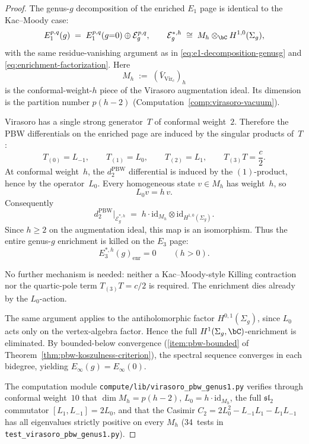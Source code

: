 \begin{proof}
The genus-$g$ decomposition of the enriched $E_1$ page is identical to
the Kac--Moody case:
\[
E_1^{p,q}(g) \;=\; E_1^{p,q}(g{=}0) \oplus \mathcal{E}^{p,q}_g,
\qquad
\mathcal{E}_g^{*,h} \;\cong\; M_h \otimes_{\bC} H^{1,0}(\Sigma_g),
\]
with the same residue-vanishing argument as in
\eqref{eq:e1-decomposition-genusg} and
\eqref{eq:enrichment-factorization}.  Here
\[
M_h \;:=\; (\bar{V}_{\mathrm{Vir}_c})_h
\]
is the conformal-weight-$h$ piece of the Virasoro augmentation ideal.
Its dimension is the partition number $p(h-2)$
\textup{(}Computation~\textup{\ref{comp:virasoro-vacuum}}\textup{)}.

Virasoro has a single
strong generator~$T$ of conformal weight~$2$.  Therefore the PBW
differentials on the enriched page are induced by the singular
products of~$T$:
\[
T_{(0)} = L_{-1}, \qquad
T_{(1)} = L_0, \qquad
T_{(2)} = L_1, \qquad
T_{(3)}T = \frac{c}{2}.
\]
At conformal weight~$h$, the $d_2^{\mathrm{PBW}}$ differential is
induced by the $(1)$-product, hence by the operator~$L_0$.
Every homogeneous state $v \in M_h$ has weight~$h$, so
\[
L_0 v = h\,v.
\]
Consequently
\[
d_2^{\mathrm{PBW}}\big|_{\mathcal{E}_g^{*,h}}
\;=\;
h \cdot \mathrm{id}_{M_h}
\otimes
\mathrm{id}_{H^{1,0}(\Sigma_g)}.
\]
Since $h \geq 2$ on the augmentation ideal, this map is an
isomorphism.  Thus the entire genus-$g$ enrichment is killed on the
$E_3$ page:
\[
E_3^{*,h}(g)_{\mathrm{enr}} = 0
\qquad (h > 0).
\]

No further mechanism is needed: neither a Kac--Moody-style Killing
contraction nor the quartic-pole term $T_{(3)}T = c/2$ is required.
The enrichment dies already by the $L_0$-action.

The same argument applies to the antiholomorphic factor
$H^{0,1}(\Sigma_g)$, since $L_0$ acts only on the vertex-algebra
factor.  Hence the full $H^1(\Sigma_g,\bC)$-enrichment is eliminated.
By bounded-below convergence
\textup{(}\ref{item:pbw-bounded} of
Theorem~\ref{thm:pbw-koszulness-criterion}\textup{)}, the spectral
sequence converges in each bidegree, yielding
$E_\infty(g) = E_\infty(0)$.

The computation module
\texttt{compute/lib/virasoro\_pbw\_genus1.py}
verifies through conformal weight~$10$ that
$\dim M_h = p(h-2)$,
$L_0 = h \cdot \mathrm{id}_{M_h}$,
the full $\mathfrak{sl}_2$ commutator $[L_1, L_{-1}] = 2L_0$,
and that the Casimir $C_2 = 2L_0^2 - L_{-1}L_1 - L_1L_{-1}$
has all eigenvalues strictly positive on every $M_h$
(34~tests in \texttt{test\_virasoro\_pbw\_genus1.py}).
\end{proof}


